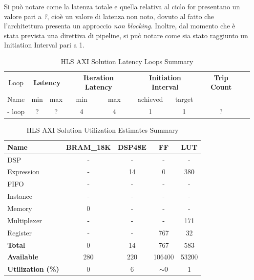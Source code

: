 Si può notare come la latenza totale e quella relativa al ciclo for presentano un valore pari a \textit{?}, cioè un valore di latenza non noto, dovuto al fatto che l'architettura presenta un approccio \textit{non blocking}. Inoltre, dal momento che è stata prevista una direttiva di pipeline, si può notare come sia stato raggiunto un Initiation Interval pari a 1.

\begin{table}[H]
	\centering
	\begin{tabular}{|c|c|c|c|c|c|c|c|c|}
		\hline
		\multicolumn{1}{|c|}{Loop} & \multicolumn{2}{|c|}{\textbf{Latency}} & \multicolumn{2}{c|}{\textbf{Iteration Latency}} & \multicolumn{2}{c|}{\textbf{Initiation Interval}} & \multicolumn{1}{c|}{\textbf{Trip Count}}  \\
		Name & min & max & min & max & achieved & target &  \\
		\hline
		- loop & ? & ? & 4 & 4 & 1 & 1 & ? \\
		\hline
	\end{tabular}
	\caption{HLS AXI Solution Latency Loops Summary }
	\label{tab:hls-axi-solution-loop-summary}
\end{table}

\begin{table}[H]
	\centering
	\begin{tabular}{|l|c|c|c|c|}
		\hline
		\textbf{Name}    & \textbf{BRAM\_18K} & \textbf{DSP48E} & \textbf{FF} & \textbf{LUT} \\ \hline
		DSP              & -                   & -               & -           & -            \\ 
		Expression       & -                   & 14               & 0           & 380          \\ 
		FIFO             & -                   & -               & -           & -            \\ 
		Instance         & -                   & -               & -           & -            \\ 
		Memory           & 0                   & -               & -          & -            \\ 
		Multiplexer      & -                   & -               & -           & 171          \\ 
		Register         & -                   & -               & 767         & 32            \\ \hline
		\textbf{Total}   & 0                   & 14               & 767         & 583          \\ \hline
		\textbf{Available} & 280               & 220             & 106400      & 53200        \\ \hline
		\textbf{Utilization (\%)} & 0            & 6              & $\sim$0     & 1      \\ \hline
	\end{tabular}
	\caption{HLS AXI Solution Utilization Estimates Summary}
	\label{tab:hls-axi-solution-utilization-estimates-summary}
\end{table}

